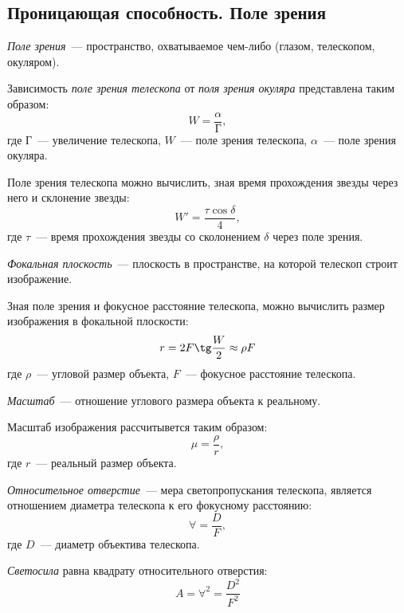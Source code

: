 \subsection{Проницающая способность. Поле зрения}

\textit{Поле зрения}~--- пространство, охватываемое чем-либо (глазом, телескопом, окуляром).

Зависимость \textit{поле зрения телескопа} от \textit{поля зрения окуляра} представлена таким образом:
\begin{equation}
W=\frac{\alpha}{\text{Г}},
\end{equation}
где $\text{Г}$~--- увеличение телескопа, $W$~--- поле зрения телескопа, $\alpha$~--- поле зрения окуляра.

Поле зрения телескопа можно вычислить, зная время прохождения звезды через него и склонение звезды:
\begin{equation}
W'=\frac{\tau\cos\delta}{4},
\end{equation}
где $\tau$~--- время прохождения звезды со сколонением $\delta$ через поле зрения.

\textit{Фокальная плоскость}~--- плоскость в пространстве, на которой телескоп строит изображение.

Зная поле зрения и фокусное расстояние телескопа, можно вычислить размер изображения в фокальной плоскости:
\begin{equation}
r=2F\tg\frac{W}{2}\approx\rho F
\end{equation}
где $\rho$~--- угловой размер объекта, $F$~--- фокусное расстояние телескопа.

\textit{Масштаб}~--- отношение углового размера объекта к реальному.

Масштаб изображения рассчитывется таким образом:
\begin{equation}
\mu=\frac{\rho}{r},
\end{equation}
где $r$~--- реальный размер объекта.

\textit{Относительное отверстие}~--- мера светопропускания телескопа, является отношением диаметра телескопа к его фокусному расстоянию:
\begin{equation}
\forall=\frac{D}{F},
\end{equation}
где $D$~--- диаметр объектива телескопа.

\textit{Светосила} равна квадрату относительного отверстия:
\begin{equation}
A=\forall^2=\frac{D^2}{F^2}
\end{equation}

